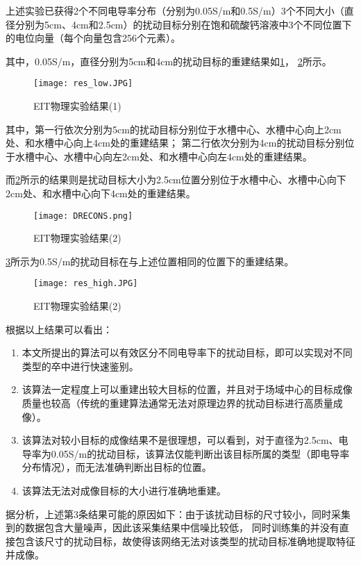 上述实验已获得2个不同电导率分布（分别为0.05S/m和0.5S/m）3个不同大小（直径分别为5cm、4cm和2.5cm）的扰动目标分别在饱和硫酸钙溶液中3个不同位置下的电位向量（每个向量包含256个元素）。

其中，0.05S/m，直径分别为5cm和4cm的扰动目标的重建结果如\cref{figure:res_low}， \cref{figure:DRECONS}所示。
\begin{figure}[h]
    \centering
    \texttt{[image: res\_low.JPG]}
    \caption{EIT物理实验结果(1)}
    \label{figure:res_low}
\end{figure}
其中，第一行依次分别为5cm的扰动目标分别位于水槽中心、水槽中心向上2cm处、和水槽中心向上4cm处的重建结果；
第二行依次分别为4cm的扰动目标分别位于水槽中心、水槽中心向左2cm处、和水槽中心向左4cm处的重建结果。

而\cref{figure:DRECONS}所示的结果则是扰动目标大小为2.5cm位置分别位于水槽中心、水槽中心向下2cm处、和水槽中心向下4cm处的重建结果。

\begin{figure}[h]
    \centering
    \texttt{[image: DRECONS.png]}
    \caption{EIT物理实验结果(2)}
    \label{figure:DRECONS}
\end{figure}

\cref{figure:res_high}所示为0.5S/m的扰动目标在与上述位置相同的位置下的重建结果。
\begin{figure}[h]
    \centering
    \texttt{[image: res\_high.JPG]}
    \caption{EIT物理实验结果(2)}
    \label{figure:res_high}
\end{figure}

根据以上结果可以看出：
\begin{enumerate}
    \item 本文所提出的算法可以有效区分不同电导率下的扰动目标，即可以实现对不同类型的卒中进行快速鉴别。
    \item 该算法一定程度上可以重建出较大目标的位置，并且对于场域中心的目标成像质量也较高（传统的重建算法通常无法对原理边界的扰动目标进行高质量成像）。
    \item 该算法对较小目标的成像结果不是很理想，可以看到，对于直径为2.5cm、电导率为0.05S/m的扰动目标，该算法仅能判断出该目标所属的类型（即电导率分布情况），而无法准确判断出目标的位置。
    \item 该算法无法对成像目标的大小进行准确地重建。
\end{enumerate}

据分析，上述第3条结果可能的原因如下：由于该扰动目标的尺寸较小，同时采集到的数据包含大量噪声，因此该采集结果中信噪比较低，
同时训练集的并没有直接包含该尺寸的扰动目标，故使得该网络无法对该类型的扰动目标准确地提取特征并成像。

